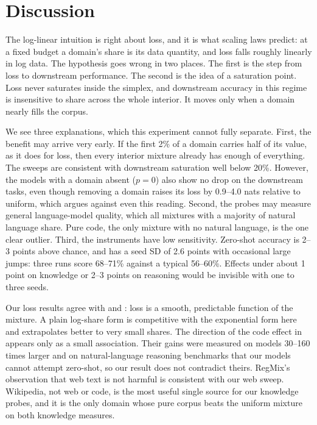 \section{Discussion}
\label{sec:discussion}

The log-linear intuition is right about loss, and it is what scaling laws predict: at a fixed budget a domain's share is its data quantity, and loss falls roughly linearly in log data.
The hypothesis goes wrong in two places.
The first is the step from loss to downstream performance.
The second is the idea of a saturation point.
Loss never saturates inside the simplex, and downstream accuracy in this regime is insensitive to share across the whole interior.
It moves only when a domain nearly fills the corpus.

We see three explanations, which this experiment cannot fully separate.
First, the benefit may arrive very early.
If the first 2\% of a domain carries half of its value, as it does for loss, then every interior mixture already has enough of everything.
The sweeps are consistent with downstream saturation well below 20\%.
However, the models with a domain absent ($p = 0$) also show no drop on the downstream tasks, even though removing a domain raises its loss by 0.9--4.0 nats relative to uniform, which argues against even this reading.
Second, the probes may measure general language-model quality, which all mixtures with a majority of natural language share.
Pure code, the only mixture with no natural language, is the one clear outlier.
Third, the instruments have low sensitivity.
Zero-shot accuracy is 2--3 points above chance, and \proofwriter has a seed SD of 2.6 points with occasional large jumps: three runs score 68--71\% against a typical 56--60\%.
Effects under about 1 point on knowledge or 2--3 points on reasoning would be invisible with one to three seeds.

Our loss results agree with \citet{ye2025datamixing} and \citet{shukor2025scaling}: loss is a smooth, predictable function of the mixture.
A plain log-share form is competitive with the exponential form here and extrapolates better to very small shares.
The direction of the code effect in \citet{aryabumi2025code} appears only as a small \listops association.
Their gains were measured on models 30--160 times larger and on natural-language reasoning benchmarks that our models cannot attempt zero-shot, so our result does not contradict theirs.
RegMix's observation that web text is not harmful \citep{liu2025regmix} is consistent with our web sweep.
Wikipedia, not web or code, is the most useful single source for our knowledge probes, and it is the only domain whose pure corpus beats the uniform mixture on both knowledge measures.

